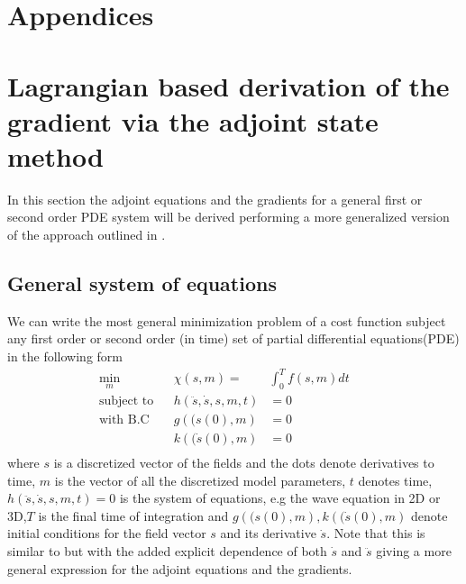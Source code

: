 \documentclass[10pt]{SelfArx} %
\theoremstyle{definition}
\begin{document}



\appendix
\section*{Appendices}
\section{Lagrangian based derivation of the gradient via the adjoint state method}\label{sec:general_math}
In this section the adjoint equations and the gradients for a general first or second order PDE system will be derived performing a more generalized version of the approach outlined in \cite{Bradley2012}.
\subsection{General system of equations}
\label{sec:general_system}
We can write the most general minimization problem of a cost function subject any first order or second order (in time) set of partial differential equations(PDE) in the following form
\begin{equation}
\label{eq:general_system}
\begin{aligned}
\underset{m}{\text{min}} &&  \chi\left(s,m\right) = &  \int_0^T f\left(s,m\right) dt & &\\
\text{subject to} & & h\left(\ddot{s}, \dot{s}, s, m, t\right) & =  0 \\
 \text{with B.C} & & g\left((s\left(0\right), m\right) & = 0 \\
 & & k\left((\dot{s}\left(0\right), m\right) & = 0 \\
\end{aligned}
\end{equation}
where $s$ is a discretized vector of the fields and the dots denote derivatives to time, $m$ is the vector of all the discretized model parameters, $t$ denotes time, $h\left(\ddot{s}, \dot{s}, s, m, t\right)  =  0$ is the system of equations, e.g the wave equation in 2D or 3D,$T$ is the final time of integration and $g\left((s\left(0\right), m\right), k\left((\dot{s}\left(0\right), m\right)$ denote initial conditions for the field vector $s$ and its derivative $\dot{s}$. Note that this is similar to \cite{Bradley2012} but with the added explicit dependence of both $\dot s$ and $\ddot s$ giving a more general expression for the adjoint equations and the gradients. 
\end{document}
